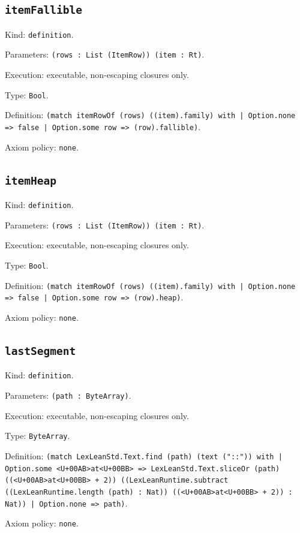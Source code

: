 \documentclass[11pt]{article}
\begin{document}
\subsection*{\texttt{itemFallible}}
\noindent Kind: \texttt{definition}.\par
\noindent Parameters: \texttt{(rows : List (ItemRow)) (item : Rt)}.\par
\noindent Execution: executable, non-escaping closures only.\par
\noindent Type: \texttt{Bool}.\par
\noindent Definition: \texttt{(match itemRowOf (rows) ((item).family) with | Option.none => false | Option.some row => (row).fallible)}.\par
\noindent Axiom policy: \texttt{none}.\par
\subsection*{\texttt{itemHeap}}
\noindent Kind: \texttt{definition}.\par
\noindent Parameters: \texttt{(rows : List (ItemRow)) (item : Rt)}.\par
\noindent Execution: executable, non-escaping closures only.\par
\noindent Type: \texttt{Bool}.\par
\noindent Definition: \texttt{(match itemRowOf (rows) ((item).family) with | Option.none => false | Option.some row => (row).heap)}.\par
\noindent Axiom policy: \texttt{none}.\par
\subsection*{\texttt{lastSegment}}
\noindent Kind: \texttt{definition}.\par
\noindent Parameters: \texttt{(path : ByteArray)}.\par
\noindent Execution: executable, non-escaping closures only.\par
\noindent Type: \texttt{ByteArray}.\par
\noindent Definition: \texttt{(match LexLeanStd.Text.find (path) (text ("::")) with | Option.some <U+00AB>at<U+00BB> => LexLeanStd.Text.sliceOr (path) ((<U+00AB>at<U+00BB> + 2)) ((LexLeanRuntime.subtract ((LexLeanRuntime.length (path) : Nat)) ((<U+00AB>at<U+00BB> + 2)) : Nat)) | Option.none => path)}.\par
\noindent Axiom policy: \texttt{none}.\par
\end{document}

